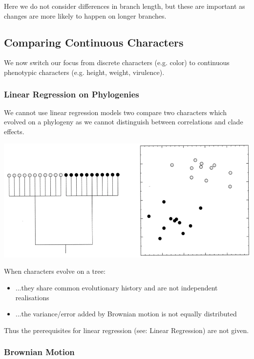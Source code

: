 \documentclass{article}
\begin{document}
\begin{multicols*}{3}
Here we do not consider differences in branch length, but these are important as changes are more likely to happen on longer branches. 

\subsection{Comparing Continuous Characters}

We now switch our focus from discrete characters (e.g. color) to continuous phenotypic characters (e.g. height, weight, virulence). 

\subsubsection{Linear Regression on Phylogenies}

We cannot use linear regression models two compare two characters which evolved on a phylogeny as we cannot distinguish between correlations and clade effects. 

\begin{center}
    \includegraphics[width=1\linewidth, angle=0.6]{phyloregress.png}
\end{center}

When characters evolve on a tree:

\begin{itemize}
    \item ...they share common evolutionary history and are not independent realisations
    \item ...the variance/error added by Brownian motion is not equally distributed 
\end{itemize}

Thus the prerequisites for linear regression (see: {\color{astral}Linear Regression}) are not given.  
\subsubsection{Brownian Motion}


\end{multicols*}
\end{document}
